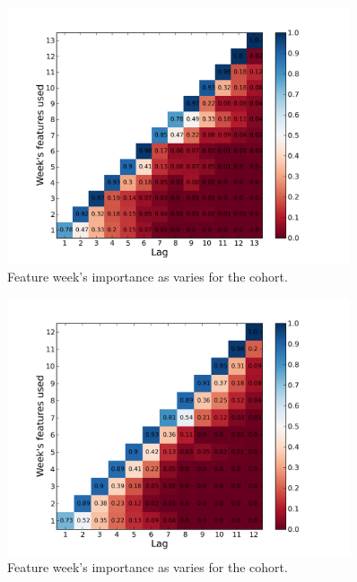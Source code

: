 \begin{paragraph}
\begin{figure}[ht!]
  \caption{Feature week's importance as \lag varies for the \neither cohort.}\label{fig:randomized_over_time_no_collab}
  \centering
    \includegraphics[width=0.9\textwidth]{figures/logreg/randomized_no_collab_over_time.png}
\end{figure}

\begin{figure}[ht!]
  \caption{Feature week's importance as \lag varies for the \forum cohort.}\label{fig:randomized_over_time_forum_only}
  \centering
    \includegraphics[width=0.9\textwidth]{figures/logreg/randomized_forum_only_over_time.png}
\end{figure}


\end{paragraph}
